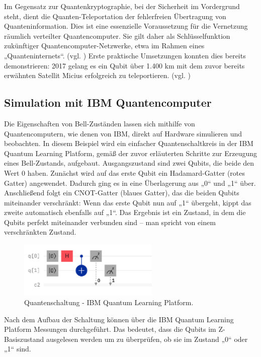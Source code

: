 Im Gegensatz zur Quantenkryptographie, bei der Sicherheit im Vordergrund steht, dient die Quanten-Teleportation der fehlerfreien Übertragung von Quanteninformation. Dies ist eine essenzielle Voraussetzung für die Vernetzung räumlich verteilter Quantencomputer. Sie gilt daher als Schlüsselfunktion zukünftiger Quantencomputer-Netzwerke, etwa im Rahmen eines „Quanteninternets“. (vgl. \cite{Entanglement Distribution}) Erste praktische Umsetzungen konnten dies bereits demonstrieren: 2017 gelang es ein Qubit über 1.400 km mit dem zuvor bereits erwähnten Satellit Micius erfolgreich zu teleportieren. (vgl. \cite{Ground-to-satellite })


\subsection{Simulation mit IBM Quantencomputer}
Die Eigenschaften von Bell-Zuständen lassen sich mithilfe von Quantencomputern, wie denen von IBM, direkt auf Hardware simulieren und beobachten. In diesem Beispiel wird ein einfacher Quantenschaltkreis in der IBM Quantum Learning Platform, gemäß der zuvor erläuterten Schritte zur Erzeugung eines Bell-Zustands, aufgebaut. Ausgangszustand sind zwei Qubits, die beide den Wert 0 haben. Zunächst wird auf das erste Qubit ein Hadamard-Gatter (rotes Gatter) angewendet. Dadurch ging es in eine Überlagerung aus „0“ und „1“ über. Anschließend folgt ein CNOT-Gatter (blaues Gatter), das die beiden Qubits miteinander verschränkt: Wenn das erste Qubit nun auf „1“ übergeht, kippt das zweite automatisch ebenfalls auf „1“. Das Ergebnis ist ein Zustand, in dem die Qubits perfekt miteinander verbunden sind – man spricht von einem verschränkten Zustand. 

\begin{figure}[h]
    \centering
    \includegraphics[width=0.6\textwidth]{images/quantum-information/Schaltung_IBM.png}
    \caption{Quantenschaltung - IBM Quantum Learning Platform.}
    \label{fig:meinbild}
\end{figure}

Nach dem Aufbau der Schaltung können über die IBM Quantum Learning Platform Messungen durchgeführt. Das bedeutet, dass die Qubits im Z-Basiszustand ausgelesen werden um zu überprüfen, ob sie im Zustand „0“ oder „1“ sind. 

